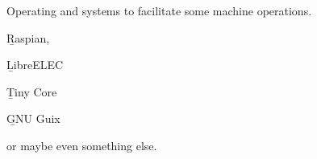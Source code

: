 
Operating and systems to facilitate some machine operations.

{\b Raspian,}

{\b LibreELEC}

{\b Tiny Core}

{\b GNU Guix}

or maybe even something else.
\bye
